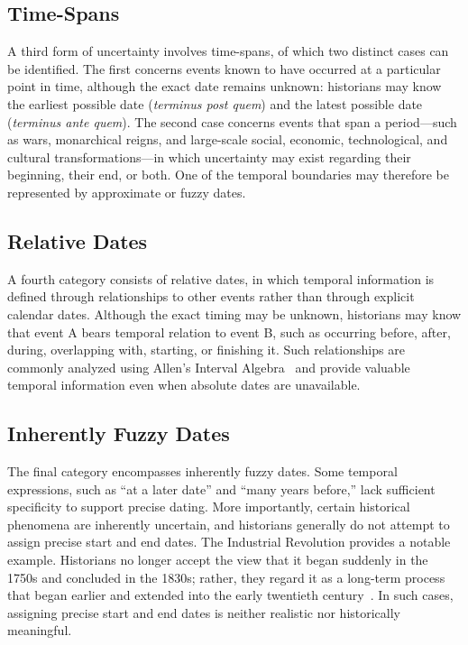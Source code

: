 \documentclass[final]{anthology-ch} %
\begin{document}
\subsection{Time-Spans}

A third form of uncertainty involves time-spans, of which two distinct cases can be identified. The first concerns events known to have occurred at a particular point in time, although the exact date remains unknown: historians may know the earliest possible date (\textit{terminus post quem}) and the latest possible date (\textit{terminus ante quem}). The second case concerns events that span a period---such as wars, monarchical reigns, and large-scale social, economic, technological, and cultural transformations---in which uncertainty may exist regarding their beginning, their end, or both. One of the temporal boundaries may therefore be represented by approximate or fuzzy dates.

\subsection{Relative Dates}

A fourth category consists of relative dates, in which temporal information is defined through relationships to other events rather than through explicit calendar dates. Although the exact timing may be unknown, historians may know that event A bears temporal relation to event B, such as occurring before, after, during, overlapping with, starting, or finishing it. Such relationships are commonly analyzed using Allen's Interval Algebra~\cite{allen1983maintaining} and provide valuable temporal information even when absolute dates are unavailable.

\subsection{Inherently Fuzzy Dates}

The final category encompasses inherently fuzzy dates. Some temporal expressions, such as \enquote{at a later date} and \enquote{many years before,} lack sufficient specificity to support precise dating. More importantly, certain historical phenomena are inherently uncertain, and historians generally do not attempt to assign precise start and end dates. The Industrial Revolution provides a notable example. Historians no longer accept the view that it began suddenly in the 1750s and concluded in the 1830s; rather, they regard it as a long-term process that began earlier and extended into the early twentieth century~\cite[24-25]{berg1992rehabilitating}\cite[26]{stobart1996eighteenth}\cite[196]{withers1985mapping}. In such cases, assigning precise start and end dates is neither realistic nor historically meaningful.
\end{document}
